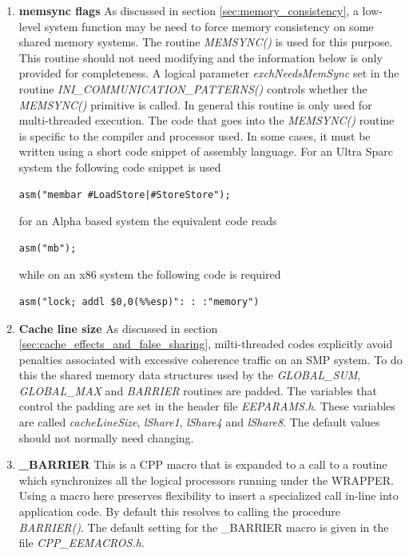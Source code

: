 \begin{enumerate}
\item {\bf memsync flags}
  As discussed in section \ref{sec:memory_consistency}, a low-level
  system function may be need to force memory consistency on some
  shared memory systems.  The routine {\em MEMSYNC()} is used for this
  purpose. This routine should not need modifying and the information
  below is only provided for completeness. A logical parameter {\em
    exchNeedsMemSync} set in the routine {\em
    INI\_COMMUNICATION\_PATTERNS()} controls whether the {\em
    MEMSYNC()} primitive is called. In general this routine is only
  used for multi-threaded execution.  The code that goes into the {\em
    MEMSYNC()} routine is specific to the compiler and processor used.
  In some cases, it must be written using a short code snippet of
  assembly language.  For an Ultra Sparc system the following code
  snippet is used
\begin{verbatim}
asm("membar #LoadStore|#StoreStore");
\end{verbatim}
for an Alpha based system the equivalent code reads
\begin{verbatim}
asm("mb");
\end{verbatim}
while on an x86 system the following code is required
\begin{verbatim}
asm("lock; addl $0,0(%%esp)": : :"memory")
\end{verbatim}

\item {\bf Cache line size}
  As discussed in section \ref{sec:cache_effects_and_false_sharing},
  milti-threaded codes explicitly avoid penalties associated with
  excessive coherence traffic on an SMP system. To do this the shared
  memory data structures used by the {\em GLOBAL\_SUM}, {\em
    GLOBAL\_MAX} and {\em BARRIER} routines are padded. The variables
  that control the padding are set in the header file {\em
    EEPARAMS.h}. These variables are called {\em cacheLineSize}, {\em
    lShare1}, {\em lShare4} and {\em lShare8}. The default values
  should not normally need changing.

\item {\bf \_BARRIER}
  This is a CPP macro that is expanded to a call to a routine which
  synchronizes all the logical processors running under the WRAPPER.
  Using a macro here preserves flexibility to insert a specialized
  call in-line into application code. By default this resolves to
  calling the procedure {\em BARRIER()}. The default setting for the
  \_BARRIER macro is given in the file {\em CPP\_EEMACROS.h}.


\end{enumerate}
